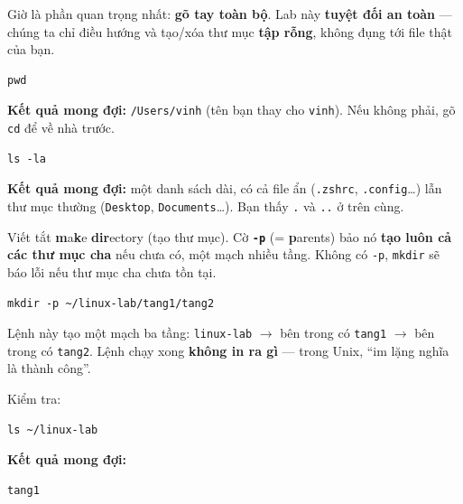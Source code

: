 \documentclass[12pt,a4paper]{article}
\begin{document}
Giờ là phần quan trọng nhất: \textbf{gõ tay toàn bộ}. Lab này \textbf{tuyệt đối an toàn} --- chúng ta chỉ điều hướng và tạo/xóa thư mục \textbf{tập rỗng}, không đụng tới file thật của bạn.

\begin{labbox}[title={Bước 1 --- Xác định vị trí}]
\begin{codebox}
\begin{verbatim}
pwd
\end{verbatim}
\end{codebox}
\textbf{Kết quả mong đợi:} \texttt{/Users/vinh} (tên bạn thay cho \texttt{vinh}). Nếu không phải, gõ \texttt{cd} để về nhà trước.
\end{labbox}

\begin{labbox}[title={Bước 2 --- Xem có gì trong nhà}]
\begin{codebox}
\begin{verbatim}
ls -la
\end{verbatim}
\end{codebox}
\textbf{Kết quả mong đợi:} một danh sách dài, có cả file ẩn (\texttt{.zshrc}, \texttt{.config}\ldots) lẫn thư mục thường (\texttt{Desktop}, \texttt{Documents}\ldots). Bạn thấy \texttt{.} và \texttt{..} ở trên cùng.
\end{labbox}

\begin{notebox}[title={Thuật ngữ --- \texttt{mkdir}}]
Viết tắt \textbf{m}a\textbf{k}e \textbf{dir}ectory (tạo thư mục). Cờ \textbf{\texttt{-p}} (= \textbf{p}arents) bảo nó \textbf{tạo luôn cả các thư mục cha} nếu chưa có, một mạch nhiều tầng. Không có \texttt{-p}, \texttt{mkdir} sẽ báo lỗi nếu thư mục cha chưa tồn tại.
\end{notebox}

\begin{labbox}[title={Bước 3 --- Tạo sân tập (giới thiệu \texttt{mkdir})}]
\begin{codebox}
\begin{verbatim}
mkdir -p ~/linux-lab/tang1/tang2
\end{verbatim}
\end{codebox}
Lệnh này tạo một mạch ba tầng: \texttt{linux-lab} $\rightarrow$ bên trong có \texttt{tang1} $\rightarrow$ bên trong có \texttt{tang2}. Lệnh chạy xong \textbf{không in ra gì} --- trong Unix, ``im lặng nghĩa là thành công''.

Kiểm tra:
\begin{codebox}
\begin{verbatim}
ls ~/linux-lab
\end{verbatim}
\end{codebox}
\textbf{Kết quả mong đợi:}
\begin{codebox}
\begin{verbatim}
tang1
\end{verbatim}
\end{codebox}
\end{labbox}
\end{document}
